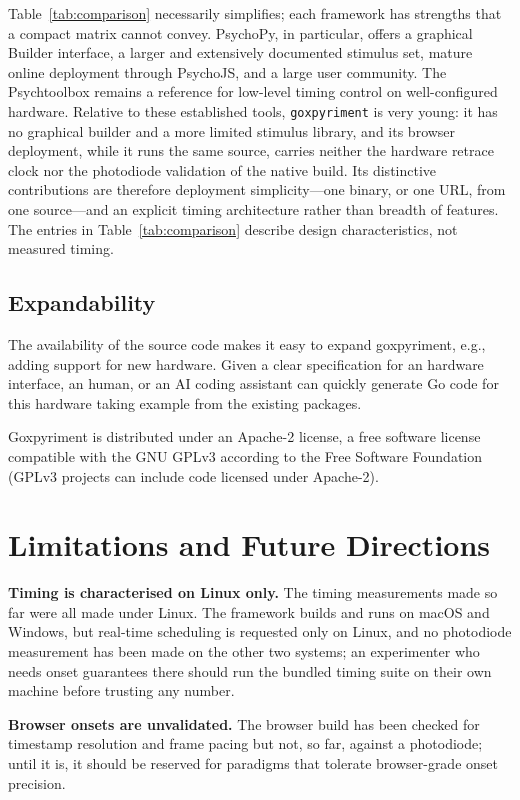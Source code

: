 \documentclass[doc,a4paper,floatsintext]{apa7}
\begin{document}
Table~\ref{tab:comparison} necessarily simplifies; each framework has
strengths that a compact matrix cannot convey. PsychoPy, in
particular, offers a graphical Builder interface, a larger and
extensively documented stimulus set, mature online deployment through
PsychoJS, and a large user community. The Psychtoolbox remains a
reference for low-level timing control on well-configured
hardware. Relative to these established tools, \texttt{goxpyriment} is
very young: it has no graphical builder and a more limited stimulus
library, and its browser deployment, while it runs the same source,
carries neither the hardware retrace clock nor the photodiode
validation of the native build. Its distinctive contributions are
therefore deployment simplicity---one binary, or one URL, from one
source---and an explicit timing architecture rather than breadth of
features. The entries in
Table~\ref{tab:comparison} describe design characteristics, not measured
timing.


\subsection{Expandability}

The availability of the source code makes it easy to expand
goxpyriment, e.g., adding support for new hardware. Given a clear
specification for an hardware interface, an human, or an AI coding
assistant can quickly generate Go code for this hardware taking
example from the existing packages.

Goxpyriment is distributed under an Apache-2 license, a free software
license compatible with the GNU GPLv3 according to the Free Software
Foundation (GPLv3 projects can include code licensed under Apache-2).

\section{Limitations and Future Directions}\label{limitations-and-future-directions}

\textbf{Timing is characterised on Linux only.} The timing measurements
made so far were all made under Linux. The
framework builds and runs on macOS and Windows, but real-time
scheduling is requested only on Linux, and no photodiode measurement
has been made on the other two systems; an experimenter who needs
onset guarantees there should run the bundled timing suite on their
own machine before trusting any number.

\textbf{Browser onsets are unvalidated.} The browser build has been
checked for timestamp resolution and frame pacing but not, so far,
against a photodiode; until it is, it should be reserved for paradigms
that tolerate browser-grade onset precision.
\end{document}
